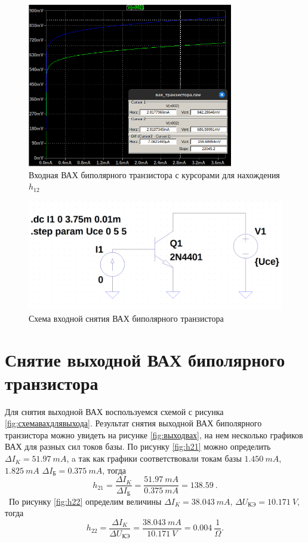 \begin{figure}[H]
    \centering
    \includegraphics[width=0.8\textwidth]{figs/h12.png}
    \caption{Входная ВАХ биполярного транзистора с курсорами для нахождения $h_{12}$}
    \label{fig:h12}
\end{figure}

\begin{figure}[H]
    \centering
    \includegraphics[width=1\textwidth]{figs/схемавах.png}
    \caption{Схема входной снятия ВАХ биполярного транзистора}
    \label{fig:схемавах}
\end{figure}



\section*{Снятие выходной ВАХ биполярного транзистора}

Для снятия выходной ВАХ воспользуемся схемой с рисунка \ref{fig:схемавахдлявыхода}.
Результат снятия выходной ВАХ биполярного транзистора можно увидеть на рисунке \ref{fig:выходвах},
на нем несколько графиков ВАХ для разных сил токов базы. 
По рисунку \ref{fig:h21} можно определить $\Delta I_K=51.97\ mA$, a так как графики соответствовали
токам базы $1.450\ mA$, $1.825\ mA$ $\Delta I_\text{Б}=0.375\ mA$, тогда
\begin{equation*}
    h_{21}=\frac{\Delta I_K}{\Delta I_\text{Б}}=\frac{51.97\ mA}{0.375\ mA}=138.59\ .
\end{equation*}\ 
По рисунку \ref{fig:h22} определим величины
$\Delta I_K=38.043\ mA$, $\Delta U_\text{КЭ}=10.171\ V$, тогда
\begin{equation*}
    h_{22}=\frac{\Delta I_K}{\Delta U_\text{КЭ}}=\frac{38.043\ mA}{10.171\ V}=0.004\ \frac{1}{\Omega}.
\end{equation*}

